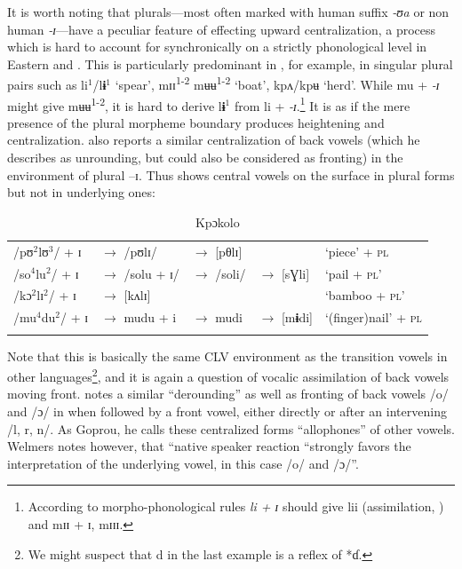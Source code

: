 \documentclass[output=paper,newtxmath,modfonts,nonflat,draft]{langsci/langscibook}
\begin{document}
It is worth noting that  plurals—most often marked with human suffix \textit{{}-ʊa} or non human \textit{{}-ɪ}—have a peculiar feature of effecting upward centralization, a process which is hard to account for synchronically on a strictly phonological level in Eastern  and  \citep{Marchese1979/1983}. This is particularly predominant in , for example, in singular plural pairs such as li$^1$/l\textbf{ɨ}$^1$ ‘spear’, mɪɪ\textsuperscript{1-2} mʉʉ\textsuperscript{1-2} ‘boat’, kpʌ/kpʉ ‘herd’.  While mu + \textit{{}-ɪ} might give mʉʉ\textsuperscript{1-2}, it is hard to derive l\textbf{ɨ}$^1$ from li + \textit{{}-ɪ}.\footnote{According to morpho-phonological rules \textit{li + ɪ} should give lii (assimilation, ) and mɪɪ + ɪ, mɪɪɪ.} It is as if the mere presence of the plural morpheme boundary produces heightening and centralization. \citet{Goprou2014} also reports a similar centralization of back vowels (which he describes as unrounding, but could also be considered as fronting) in the environment of plural –ɪ. Thus  shows central vowels on the surface in plural forms but not in underlying ones:

\begin{table}
\label{tab:zogbo:22}
\caption{Kpɔkolo \citep[202-206]{Goprou2014}}                                  
\begin{tabular}{lllll}
\lsptoprule
/pʊ$^2$lʊ$^3$/ + ɪ 
& $\rightarrow$ /pʊlɪ/  
& $\rightarrow$ [pθlɪ]        
&
& ‘piece’ + \textsc{pl}   \\

/so$^4$lu$^2$/ + ɪ  
& $\rightarrow$ /solu + ɪ/ 
& $\rightarrow$ /soli/  
& $\rightarrow$ [sƔli]   
& ‘pail + \textsc{pl}’  \\

/kɔ$^2$lɪ$^2$/ + ɪ 
& $\rightarrow$ [kʌlɪ]     
& 
&     
& ‘bamboo + \textsc{pl}’   \\

/mu$^4$du$^2$/ + ɪ  
& $\rightarrow$ mudu + i  
& $\rightarrow$ mudi 
& $\rightarrow$ [m\textbf{ɨ}di]   
& ‘(finger)nail’ + \textsc{pl}\\
\lspbottomrule
\end{tabular}	
\end{table}

Note that this is basically the same CLV environment as the transition vowels in other languages\footnote{We might suspect that d in the last example is a reflex of *ɗ.}, and it is again a question of vocalic assimilation of back vowels moving front. \citet{Welmers1973} notes a similar “derounding” as well as fronting of back vowels /o/ and /ɔ/ in  when followed by a front vowel, either directly or after an intervening /l, r, n/. As Goprou, he calls these centralized forms “allophones” of other vowels. Welmers notes however, that “native speaker reaction “strongly favors the interpretation of the underlying vowel, in this case /o/ and /ɔ/”. 
\end{document}
